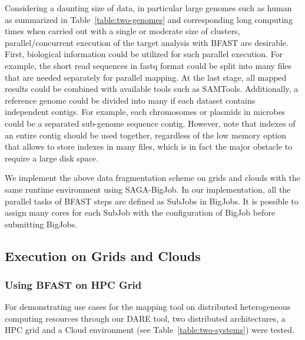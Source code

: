 \documentclass{acm_proc_article-sp}
\begin{document}
Considering a daunting size of data, in particular large genomes such as human as summarized in 
Table~\ref{table:two-genomes} and corresponding long computing times when carried out with a 
single or moderate size of clusters, parallel/concurrent execution of the target analysis with BFAST are desirable. 
 First, biological information could be utilized for such parallel execution. 
 For example, the short read sequences in fastq format could be split into many files that are 
 needed separately for parallel mapping.  At the last stage, all mapped results could be combined 
 with available tools such as SAMTools\cite{samtools}.   Additionally, a reference genome could be 
 divided into many if each dataset contains independent contigs.  For example, each chromosomes 
 or plasmids in microbes could be a separated sub-genome sequence contig.  However, note that 
 indexes of an entire contig should be used together, regardless of the low memory option that allows 
 to store indexes in many files, which is in fact the major obstacle to require a large disk space.

We implement the above data fragmentation scheme on grids and clouds with the same runtime environment using 
SAGA-BigJob\cite{saga-royalsoc,saga-ccgrid10, ecmls10}.  In our implementation, all the parallel tasks of BFAST 
steps are defined as SubJobs in BigJobs.  It is possible to assign many cores for each SubJob 
with the configuration of BigJob before submitting BigJobs. 
  

\subsection{Execution on Grids and Clouds}

\subsubsection{Using BFAST on HPC Grid}
For demonstrating use cases for the mapping tool on distributed
heterogeneous computing resources through our DARE tool, two distributed architectures, a HPC grid and a Cloud environment (see
Table~\ref{table:two-systems}) were tested.
\end{document}

